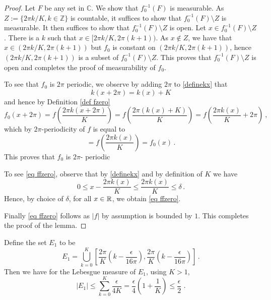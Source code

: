 \begin{proof}
Let $F$ be any set in $\mathbb{C}$. We show that
$f_0^{-1}(F)$ is measurable. As
$Z:=\{2\pi k/K, k\in \mathbb{Z}\}$ is countable, it suffices to show
that $f_0^{-1}(F)\setminus Z$ is measurable. It then
suffices to show that $f_0^{-1}(F)\setminus Z$ is open.
Let $x\in f_0^{-1}(F)\setminus Z$. There is a $k$
such that $x\in [2\pi k/K, 2\pi (k+1))$. As $x\not\in Z$,
we have that $x\in (2\pi k/K, 2\pi (k+1))$
but $f_0$ is constant on $(2\pi k/K, 2\pi (k+1))$,
hence $(2\pi k/K, 2\pi (k+1))$ is a subset of
$f_0^{-1}(F)\setminus Z$. This proves that
$f_0^{-1}(F)\setminus Z$ is open and completes the proof of measurability of $f_0$.




To see that $f_0$ is $2\pi$ periodic, we observe by
adding $2\pi$ to \eqref{definekx} that
\begin{equation}
    k(x+2\pi)=k(x)+K
\end{equation}
and hence by Definition \eqref{def fzero}
\begin{equation}
    f_0(x+2\pi)=f(\frac {2\pi k(x+2\pi)}K)=f(\frac{2\pi (k(x)+K)}{K})
        =f(\frac{2\pi k(x)}K+2\pi)\ ,
\end{equation}
which by $2\pi$-periodicity of $f$ is equal to
\begin{equation}
    =f(\frac{2\pi k(x)}K)=f_0(x)\, .
\end{equation}
    This proves that $f_0$ is $2\pi$- periodic




To see \eqref{eq ffzero}, observe that by \eqref{definekx} and by definition of $K$ we have
\begin{equation}
0\le x-\frac{2\pi k(x)}{K} \le \frac{2\pi k(x)}{K}\le \delta\, .
\end{equation}
Hence, by choice of $\delta$, for all $x\in \mathbb{R}$, we obtain \eqref{eq ffzero}.

Finally \eqref{eq ffzero} follows as $|f|$ by assumption is bounded by $1$.
This completes the proof of the lemma.
\end{proof}

Define the set $E_1$ to be
\begin{equation}
E_1=\bigcup_{k=0}^{K}[\frac{2\pi}K (k-\frac {\epsilon}{16\pi }),
\frac{2\pi}K (k-\frac {\epsilon}{16\pi})]\, .
\end{equation}
Then we have for the Lebesgue measure of $E_1$, using $K>1$,
\begin{equation}
    |E_1|\le \sum_{k=0}^{K}\frac {\epsilon}{4K}= \frac{\epsilon}{4}\left(1+\frac 1K\right)\le \frac \epsilon 2\, \, .
\end{equation}

